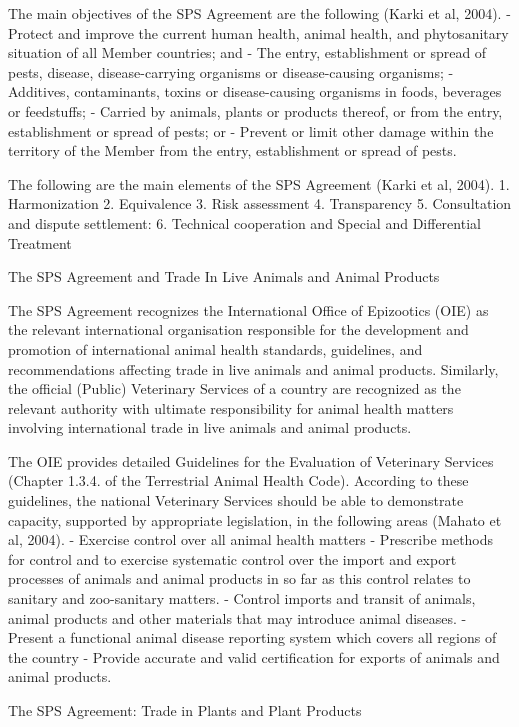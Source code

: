 \documentclass[
]{book}
\begin{document}
The main objectives of the SPS Agreement are the following (Karki et al, 2004).
- Protect and improve the current human health, animal health, and phytosanitary situation of all Member countries; and
- The entry, establishment or spread of pests, disease, disease-carrying organisms or disease-causing organisms;
- Additives, contaminants, toxins or disease-causing organisms in foods, beverages or feedstuffs;
- Carried by animals, plants or products thereof, or from the entry, establishment or spread of pests; or
- Prevent or limit other damage within the territory of the Member from the entry, establishment or spread of pests.

The following are the main elements of the SPS Agreement (Karki et al, 2004).
1. Harmonization
2. Equivalence
3. Risk assessment
4. Transparency
5. Consultation and dispute settlement:
6. Technical cooperation and Special and Differential Treatment

The SPS Agreement and Trade In Live Animals and Animal Products

The SPS Agreement recognizes the International Office of Epizootics (OIE) as the relevant international organisation responsible for the development and promotion of international animal health standards, guidelines, and recommendations affecting trade in live animals and animal products. Similarly, the official (Public) Veterinary Services of a country are recognized as the relevant authority with ultimate responsibility for animal health matters involving international trade in live animals and animal products.

The OIE provides detailed Guidelines for the Evaluation of Veterinary Services (Chapter 1.3.4. of the Terrestrial Animal Health Code). According to these guidelines, the national Veterinary Services should be able to demonstrate capacity, supported by appropriate legislation, in the following areas (Mahato et al, 2004).
- Exercise control over all animal health matters
- Prescribe methods for control and to exercise systematic control over the import and export processes of animals and animal products in so far as this control relates to sanitary and zoo-sanitary matters.
- Control imports and transit of animals, animal products and other materials that may introduce animal diseases.
- Present a functional animal disease reporting system which covers all regions of the country
- Provide accurate and valid certification for exports of animals and animal products.

The SPS Agreement: Trade in Plants and Plant Products
\end{document}
